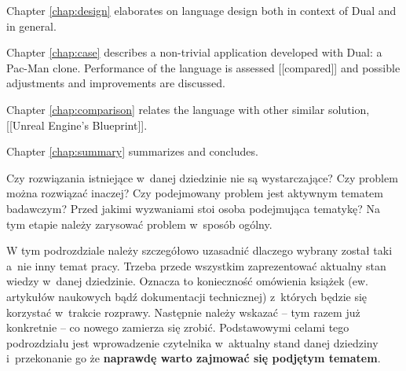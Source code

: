 Chapter \ref{chap:design} elaborates on language design both in context of Dual and in general.

Chapter \ref{chap:case} describes a non-trivial application developed with Dual: a Pac-Man clone. Performance of the language is assessed [[compared]] and possible adjustments and improvements are discussed.

Chapter \ref{chap:comparison} relates the language with other similar solution, [[Unreal Engine's Blueprint]].

Chapter \ref{chap:summary} summarizes and concludes.


 Czy rozwiązania
istniejące w~danej dziedzinie nie są wystarczające? Czy problem można rozwiązać
inaczej? Czy podejmowany problem jest aktywnym tematem badawczym? Przed jakimi
wyzwaniami stoi osoba podejmująca tematykę? Na tym etapie należy zarysować
problem w~sposób ogólny.




W tym podrozdziale należy szczegółowo uzasadnić dlaczego wybrany został taki
a~nie inny temat pracy. Trzeba przede wszystkim zaprezentować aktualny stan
wiedzy w~danej dziedzinie. Oznacza to konieczność omówienia książek
(ew. artykułów naukowych bądź dokumentacji technicznej) z~których będzie się
korzystać w~trakcie rozprawy. Następnie należy wskazać -- tym razem już
konkretnie -- co nowego zamierza się zrobić. Podstawowymi celami tego
podrozdziału jest wprowadzenie czytelnika w~aktualny stand danej dziedziny
i~przekonanie go że \textbf{naprawdę warto zajmować się podjętym tematem}.
